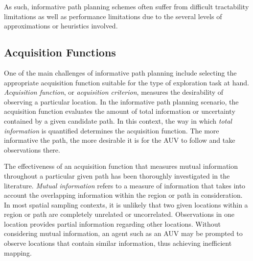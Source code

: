 			As such, informative path planning schemes often suffer from difficult tractability limitations as well as performance limitations due to the several levels of approximations or heuristics involved.
		
		\subsection{Acquisition Functions}
		\label{Background:RelatedWork:AcquisitionFunctions}
		
			One of the main challenges of informative path planning include selecting the appropriate acquisition function suitable for the type of exploration task at hand. \textit{Acquisition function}, or \textit{acquisition criterion}, measures the desirability of observing a particular location. In the informative path planning scenario, the acquisition function evaluates the amount of total information or uncertainty contained by a given candidate path. In this context, the way in which \textit{total information} is quantified determines the acquisition function. The more informative the path, the more desirable it is for the AUV to follow and take observations there.
	
			The effectiveness of an acquisition function that measures mutual information throughout a particular given path has been thoroughly investigated in the literature. \textit{Mutual information} refers to a measure of information that takes into account the overlapping information within the region or path in consideration. In most spatial sampling contexts, it is unlikely that two given locations within a region or path are completely unrelated or uncorrelated. Observations in one location provides partial information regarding other locations. Without considering mutual information, an agent such as an AUV may be prompted to observe locations that contain similar information, thus achieving inefficient mapping. %
			
